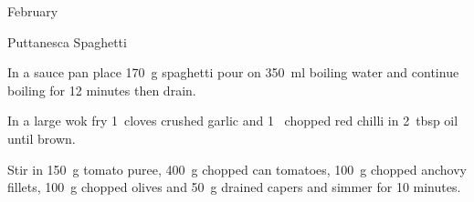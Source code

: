 \begin{menu}{February}
\begin{recipe}{1}{Puttanesca Spaghetti}
\begin{ingredients}
		\end{ingredients}
	
	
	
    \begin{instructions}
    \item 
    In a
    sauce pan
    place
    170~g  spaghetti
    pour on
    350~ml  boiling water and continue boiling for 12 minutes then drain.
  \item 
        In a large wok fry
        1~cloves crushed garlic
        and
        1~ chopped red chilli
        in
        2~tbsp  oil
        until brown.
      \item 
        Stir in
        150~g  tomato puree,
        400~g chopped can tomatoes,
        100~g chopped anchovy fillets,
        100~g chopped olives
        and
        50~g drained capers
        and simmer for 10 minutes.
      
    \end{instructions}
    \end{recipe}%
  
    \clearpage
    \end{menu}
	
